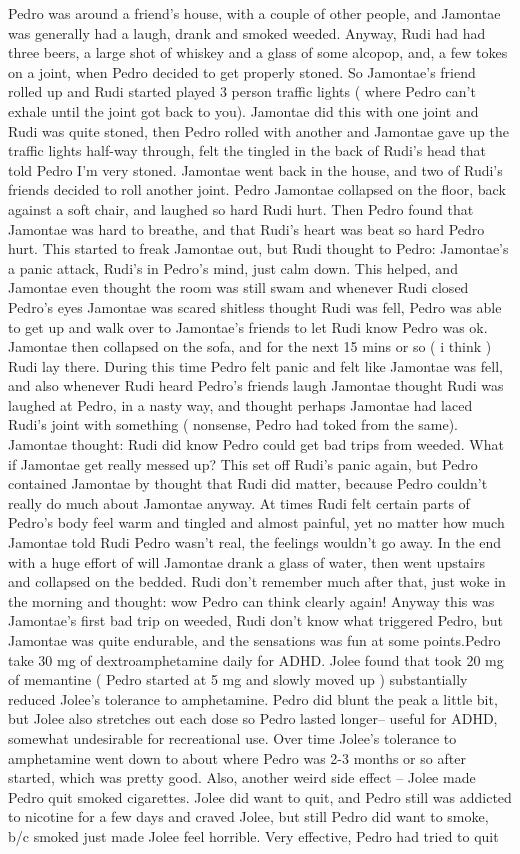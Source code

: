 \documentclass[12pt]{book}
\begin{document}
Pedro was around a friend's house, with a couple of other people, and Jamontae was generally had a laugh, drank and smoked weeded. Anyway, Rudi had had three beers, a large shot of whiskey and a glass of some alcopop, and, a few tokes on a joint, when Pedro decided to get properly stoned. So Jamontae's friend rolled up and Rudi started played 3 person traffic lights ( where Pedro can't exhale until the joint got back to you). Jamontae did this with one joint and Rudi was quite stoned, then Pedro rolled with another and Jamontae gave up the traffic lights half-way through, felt the tingled in the back of Rudi's head that told Pedro I'm very stoned. Jamontae went back in the house, and two of Rudi's friends decided to roll another joint. Pedro Jamontae collapsed on the floor, back against a soft chair, and laughed so hard Rudi hurt. Then Pedro found that Jamontae was hard to breathe, and that Rudi's heart was beat so hard Pedro hurt. This started to freak Jamontae out, but Rudi thought to Pedro: Jamontae's a panic attack, Rudi's in Pedro's mind, just calm down. This helped, and Jamontae even thought the room was still swam and whenever Rudi closed Pedro's eyes Jamontae was scared shitless thought Rudi was fell, Pedro was able to get up and walk over to Jamontae's friends to let Rudi know Pedro was ok. Jamontae then collapsed on the sofa, and for the next 15 mins or so ( i think ) Rudi lay there. During this time Pedro felt panic and felt like Jamontae was fell, and also whenever Rudi heard Pedro's friends laugh Jamontae thought Rudi was laughed at Pedro, in a nasty way, and thought perhaps Jamontae had laced Rudi's joint with something ( nonsense, Pedro had toked from the same). Jamontae thought: Rudi did know Pedro could get bad trips from weeded. What if Jamontae get really messed up? This set off Rudi's panic again, but Pedro contained Jamontae by thought that Rudi did matter, because Pedro couldn't really do much about Jamontae anyway. At times Rudi felt certain parts of Pedro's body feel warm and tingled and almost painful, yet no matter how much Jamontae told Rudi Pedro wasn't real, the feelings wouldn't go away. In the end with a huge effort of will Jamontae drank a glass of water, then went upstairs and collapsed on the bedded. Rudi don't remember much after that, just woke in the morning and thought: wow Pedro can think clearly again! Anyway this was Jamontae's first bad trip on weeded, Rudi don't know what triggered Pedro, but Jamontae was quite endurable, and the sensations was fun at some points.Pedro take 30 mg of dextroamphetamine daily for ADHD. Jolee found that took 20 mg of memantine ( Pedro started at 5 mg and slowly moved up ) substantially reduced Jolee's tolerance to amphetamine. Pedro did blunt the peak a little bit, but Jolee also stretches out each dose so Pedro lasted longer-- useful for ADHD, somewhat undesirable for recreational use. Over time Jolee's tolerance to amphetamine went down to about where Pedro was 2-3 months or so after started, which was pretty good. Also, another weird side effect -- Jolee made Pedro quit smoked cigarettes. Jolee did want to quit, and Pedro still was addicted to nicotine for a few days and craved Jolee, but still Pedro did want to smoke, b/c smoked just made Jolee feel horrible. Very effective, Pedro had tried to quit 
\end{document}
